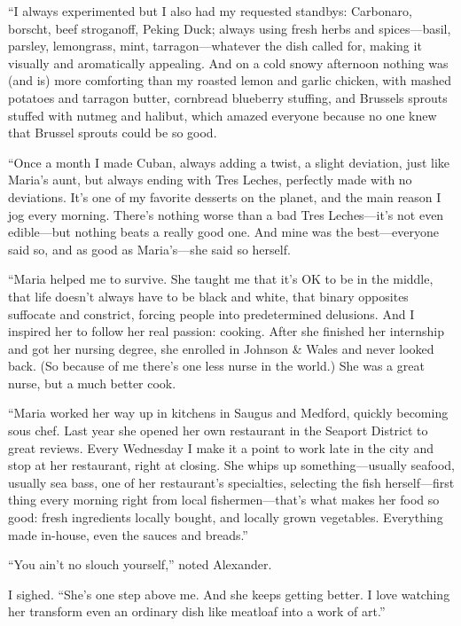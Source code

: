 ``I always experimented but I also had my requested standbys: Carbonaro,
borscht, beef stroganoff, Peking Duck; always using fresh herbs and
spices---basil, parsley, lemongrass, mint, tarragon---whatever the dish
called for, making it visually and aromatically appealing. And on a cold
snowy afternoon nothing was (and is) more comforting than my roasted
lemon and garlic chicken, with mashed potatoes and tarragon butter,
cornbread blueberry stuffing, and Brussels sprouts stuffed with nutmeg
and halibut, which amazed everyone because no one knew that Brussel
sprouts could be so good.

``Once a month I made Cuban, always adding a twist, a slight deviation,
just like Maria's aunt, but always ending with Tres Leches, perfectly
made with no deviations. It's one of my favorite desserts on the planet,
and the main reason I jog every morning. There's nothing worse than a
bad Tres Leches---it's not even edible---but nothing beats a really good
one. And mine was the best---everyone said so, and as good as
Maria's---she said so herself.

``Maria helped me to survive. She taught me that it's OK to be in the
middle, that life doesn't always have to be black and white, that binary
opposites suffocate and constrict, forcing people into predetermined
delusions. And I inspired her to follow her real passion: cooking. After
she finished her internship and got her nursing degree, she enrolled in
Johnson \& Wales and never looked back. (So because of me there's one
less nurse in the world.) She was a great nurse, but a much better cook.

``Maria worked her way up in kitchens in Saugus and Medford, quickly
becoming sous chef. Last year she opened her own restaurant in the
Seaport District to great reviews. Every Wednesday I make it a point to
work late in the city and stop at her restaurant, right at closing. She
whips up something---usually seafood, usually sea bass, one of her
restaurant's specialties, selecting the fish herself---first thing every
morning right from local fishermen---that's what makes her food so good:
fresh ingredients locally bought, and locally grown vegetables.
Everything made in-house, even the sauces and breads.''

``You ain't no slouch yourself,'' noted Alexander.

I sighed. ``She's one step above me. And she keeps getting better. I
love watching her transform even an ordinary dish like meatloaf into a
work of art.''

